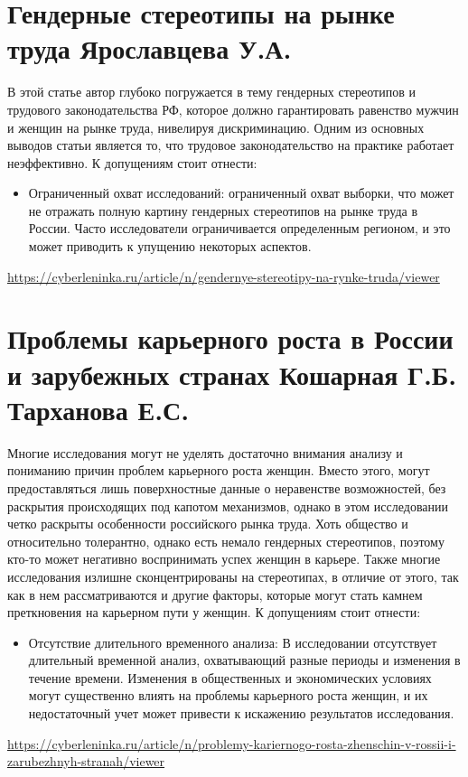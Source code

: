 \documentclass[a4paper,14pt]{article}
\begin{document}
\section{Гендерные стереотипы на рынке труда Ярославцева У.А.}
В этой статье автор глубоко погружается в тему гендерных стереотипов и трудового законодательства РФ, которое должно гарантировать равенство мужчин и женщин на рынке труда, нивелируя дискриминацию. Одним из основных выводов статьи является то, что трудовое законодательство на практике работает неэффективно.
К допущениям стоит отнести:
\begin{itemize}
    \item Ограниченный охват исследований: ограниченный охват выборки, что может не отражать полную картину гендерных стереотипов на рынке труда в России. Часто исследователи ограничивается определенным регионом, и это может приводить к упущению некоторых аспектов. 
\end{itemize}
\url{https://cyberleninka.ru/article/n/gendernye-stereotipy-na-rynke-truda/viewer}
\section{Проблемы карьерного роста в России и зарубежных странах Кошарная Г.Б. Тарханова Е.С.}
Многие исследования могут не уделять достаточно внимания анализу и пониманию причин проблем карьерного роста женщин. Вместо этого, могут предоставляться лишь поверхностные данные о неравенстве возможностей, без раскрытия происходящих под капотом механизмов, однако в этом исследовании четко раскрыты особенности российского рынка труда. Хоть общество и относительно толерантно, однако есть немало гендерных стереотипов, поэтому кто-то может негативно воспринимать успех женщин в карьере. Также многие исследования излишне сконцентрированы на стереотипах, в отличие от этого, так как в нем рассматриваются и другие факторы, которые могут стать камнем преткновения на карьерном пути у женщин.
К допущениям стоит отнести:
\begin{itemize}
    \item Отсутствие длительного временного анализа: В исследовании отсутствует длительный временной анализ, охватывающий разные периоды и изменения в течение времени. Изменения в общественных и экономических условиях могут существенно влиять на проблемы карьерного роста женщин, и их недостаточный учет может привести к искажению результатов исследования.
\end{itemize}
\url{https://cyberleninka.ru/article/n/problemy-kariernogo-rosta-zhenschin-v-rossii-i-zarubezhnyh-stranah/viewer}
\end{document}
